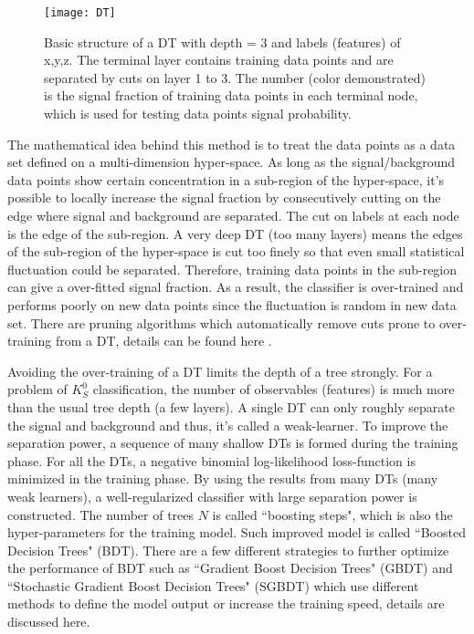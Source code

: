 \begin{figure}[htpb]
	\centering 
	\texttt{[image: DT]}
	\caption{Basic structure of a DT with depth = 3 and labels (features) of x,y,z. The terminal layer contains training data points and are separated by cuts on layer 1 to 3. The number (color demonstrated) is the signal fraction of training data points in each terminal node, which is used for testing data points signal probability.}
	\label{fig:DT}
\end{figure}

The mathematical idea behind this method is to treat the data points as a data set defined on a multi-dimension hyper-space. As long as the signal/background data points show certain concentration in a sub-region of the hyper-space, it's possible to locally increase the signal fraction by consecutively cutting on the edge where signal and background are separated. The cut on labels at each node is the edge of the sub-region. A very deep DT (too many layers) means the edges of the sub-region of the hyper-space is cut too finely so that even small statistical fluctuation could be separated. Therefore, training data points in the sub-region can give a over-fitted signal fraction. As a result, the classifier is over-trained and performs poorly on new data points since the fluctuation is random in new data set. There are pruning algorithms which automatically remove cuts prone to over-training
from a DT, details can be found here \cite{olshen1984classification}.

Avoiding the over-training of a DT limits the depth of a tree strongly. For a problem of $K_S^0$ classification, the number of observables (features) is much more than the usual tree depth (a few layers). A single DT can only roughly separate the signal and background and thus, it's called a weak-learner. To improve the separation power, a sequence of many shallow DTs is formed during the training phase. For all the DTs, a negative binomial log-likelihood loss-function is minimized in the training phase. By using the results from many DTs (many weak learners), a well-regularized classifier with large separation power is constructed. The number of trees $N$ is called ``boosting steps", which is also the hyper-parameters for the training model. Such improved model is called ``Boosted Decision Trees" (BDT). There are a few different strategies to further optimize the performance of BDT such as ``Gradient Boost Decision Trees" (GBDT) and ``Stochastic Gradient Boost Decision Trees" (SGBDT) which use different methods to define the model output or increase the training speed, details are discussed here\cite{friedman2002stochastic}.


